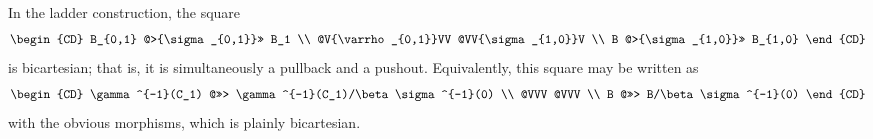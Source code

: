 \begin{proposition}[Proposition 4.2]
In the ladder construction, the square
\[
\begin{CD}
B_{0,1} @>{\sigma_{0,1}}>> B_1 \\
@V{\varrho_{0,1}}VV @VV{\sigma_{1,0}}V \\
B @>{\sigma_{1,0}}>> B_{1,0}
\end{CD}
\]
is bicartesian; that is, it is simultaneously a pullback and a pushout. Equivalently, this square may be written as
\[
\begin{CD}
\gamma^{-1}(C_1) @>>> \gamma^{-1}(C_1)/\beta\sigma^{-1}(0) \\
@VVV @VVV \\
B @>>> B/\beta\sigma^{-1}(0)
\end{CD}
\]
with the obvious morphisms, which is plainly bicartesian.
\end{proposition}
